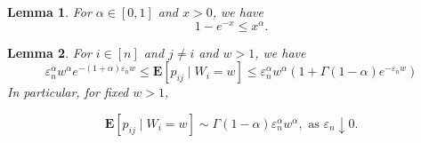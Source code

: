 \documentclass[10pt,a4paper]{amsart}
\newtheorem{lemma}{Lemma}
\newcommand{\E}{\mathbf{E}}
\newcommand{\eps}{\varepsilon}
\begin{document}
\begin{lemma}\label{lemma:surprising}
For $\alpha\in [0,1]$ and $x>0$, we have
$$1-e^{-x} \le x^{\alpha}.$$
\end{lemma}

\begin{lemma} 
 For $i\in [n]$ and $j\neq i$ and $w>1$, we have
\begin{equation}\label{cond:degree}
 \eps_n^{\alpha} w^{\alpha} e^{-(1+\alpha) \eps_n w}\le \E[ p_{ij}\mid W_i=w] \le \eps_n^{\alpha}w^\alpha(1+\Gamma(1-\alpha) e^{-\eps_n w})
 \end{equation}
 In particular, for fixed $w>1$, 
 
 \begin{equation}\label{asymp}\E[ p_{ij}\mid W_i=w]\sim \Gamma(1-\alpha)\eps_n^{\alpha} w^{\alpha}, \text{ as $\eps_n\downarrow 0$}.\end{equation}
\end{lemma}
\end{document}

